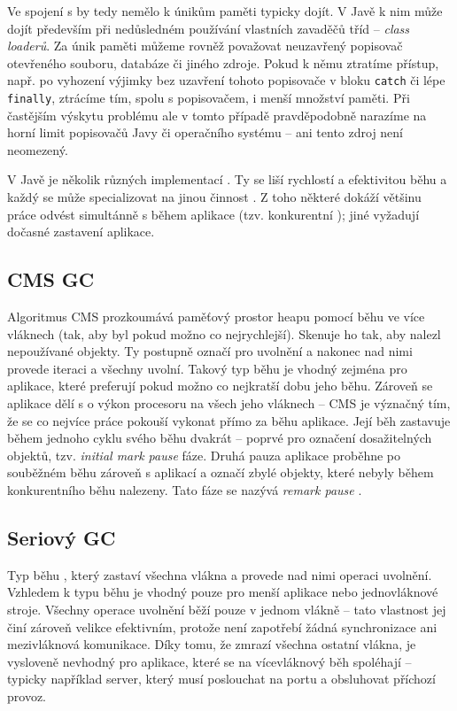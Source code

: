 Ve spojení s  by tedy nemělo k únikům paměti typicky dojít. V Javě k nim může dojít především při nedůsledném používání vlastních zavaděčů tříd -- \textit{class loaderů}. Za únik paměti můžeme rovněž považovat neuzavřený popisovač otevřeného souboru, databáze či jiného zdroje. Pokud k němu ztratíme přístup, např. po vyhození výjimky bez uzavření tohoto popisovače v bloku \texttt{catch} či lépe \texttt{finally}, ztrácíme tím, spolu s popisovačem, i menší množství paměti. Při častějším výskytu problému ale v tomto případě pravděpodobně narazíme na horní limit popisovačů Javy či operačního systému -- ani tento zdroj není neomezený.

V Javě je několik různých implementací . Ty se liší rychlostí a efektivitou běhu a každý se může specializovat na jinou činnost \cite{gc-details}. Z toho některé  dokáží většinu práce odvést simultánně s během aplikace (tzv. konkurentní ); jiné vyžadují dočasné zastavení aplikace.

\subsection{CMS GC}
Algoritmus CMS  prozkoumává paměťový prostor heapu pomocí běhu ve více vláknech (tak, aby byl pokud možno co nejrychlejší). Skenuje ho tak, aby nalezl nepoužívané objekty. Ty postupně označí pro uvolnění a nakonec nad nimi provede iteraci a všechny uvolní. Takový typ běhu  je vhodný zejména pro aplikace, které preferují pokud možno co nejkratší dobu jeho běhu. Zároveň se aplikace dělí s  o výkon procesoru na všech jeho vláknech -- CMS je význačný tím, že se co nejvíce práce pokouší vykonat přímo za běhu aplikace. Její běh zastavuje během jednoho cyklu svého běhu dvakrát -- poprvé pro označení dosažitelných objektů, tzv. \textit{initial mark pause} fáze. Druhá pauza aplikace proběhne po souběžném běhu zároveň s aplikací a označí zbylé objekty, které nebyly během konkurentního běhu nalezeny. Tato fáze se nazývá \textit{remark pause} \cite{gc-cms}.

\subsection{Seriový GC}
Typ běhu , který zastaví všechna vlákna a provede nad nimi operaci uvolnění. Vzhledem k typu běhu je vhodný pouze pro menší aplikace nebo jednovláknové stroje. Všechny operace uvolnění běží pouze v jednom vlákně -- tato vlastnost jej činí zároveň velikce efektivním, protože není zapotřebí žádná synchronizace ani mezivláknová komunikace. Díky tomu, že zmrazí všechna ostatní vlákna, je vysloveně nevhodný pro aplikace, které se na vícevláknový běh spoléhají -- typicky například server, který musí poslouchat na portu a obsluhovat příchozí provoz.

